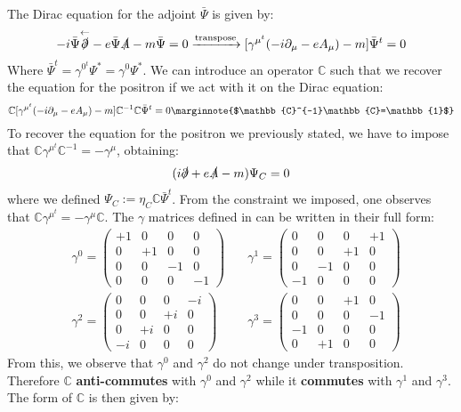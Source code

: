 \documentclass[../main.tex]{subfiles}
\begin{document}
The Dirac equation for the adjoint $\bar{\Psi}$ is given by:
\[
-i\bar{\Psi}\overset{\leftarrow}{\slashed{\partial}}-e\bar{\Psi}\slashed{A}-m\bar{\Psi}=0\xrightarrow[]{\text{transpose}}[\gamma^{\mu^t}(-i\partial_\mu-eA_\mu)-m]\bar{\Psi}^t=0
\]
Where $\bar{\Psi}^t=\gamma^{0^t}\Psi^*=\gamma^0\Psi^*$. We can introduce an operator $\mathbb{C}$ such that we recover the equation for the positron if we act with it on the Dirac equation:
\[
\mathbb{C}[\gamma^{\mu^t}(-i\partial_\mu-eA_\mu)-m]\mathbb{C}^{-1}\mathbb{C}\bar{\Psi}^t=0\marginnote{$\mathbb{C}^{-1}\mathbb{C}=\mathbb{1}$}
\]
To recover the equation for the positron we previously stated, we have to impose that $\mathbb{C}\gamma^{\mu^t}\mathbb{C}^{-1}=-\gamma^\mu$, obtaining:
\[
(i\slashed{\partial}+e\slashed{A}-m)\Psi_C=0
\]
where we defined $\Psi_C:=\eta_C\mathbb{C}\bar{\Psi}^t$. From the constraint we imposed, one observes that $\mathbb{C}\gamma^{\mu^t}=-\gamma^\mu\mathbb{C}$. The $\gamma$ matrices defined in  can be written in their full form:
\[
\begin{aligned}
&\gamma^0=\left(\begin{array}{cccc}
    +1 & 0 & 0 & 0 \\
    0 & +1 & 0 & 0 \\
    0 & 0 & -1 & 0 \\
    0 & 0 & 0 & -1
\end{array}\right) \quad &\gamma^1=\left(\begin{array}{cccc}
    0 & 0 & 0 & +1 \\
    0 & 0 & +1 & 0 \\
    0 & -1 & 0 & 0 \\
    -1 & 0 & 0 & 0
\end{array}\right) \\
&\gamma^2=\left(\begin{array}{cccc}
    0 & 0 & 0 & -i \\
    0 & 0 & +i & 0 \\
    0 & +i & 0 & 0 \\
    -i & 0 & 0 & 0
\end{array}\right) \quad &\gamma^3=\left(\begin{array}{cccc}
    0 & 0 & +1 & 0 \\
    0 & 0 & 0 & -1 \\
    -1 & 0 & 0 & 0 \\
    0 & +1 & 0 & 0
\end{array}\right) 
\end{aligned}
\]
From this, we observe that $\gamma^0$ and $\gamma^2$ do not change under transposition. Therefore $\mathbb{C}$ \textbf{anti-commutes} with $\gamma^0$ and $\gamma^2$ while it \textbf{commutes} with $\gamma^1$ and $\gamma^3$. The form of $\mathbb{C}$ is then given by:
\end{document}
